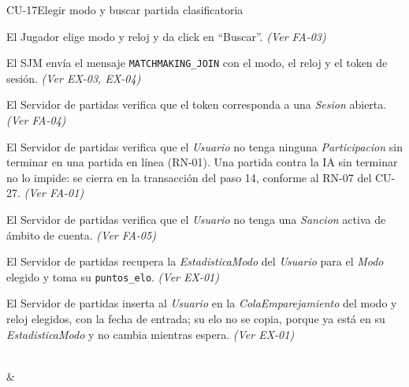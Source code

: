 \begin{fichacu}{CU-17}{Elegir modo y buscar partida clasificatoria}
{\begin{cuenum}[start=1]
      \item El Jugador elige modo y reloj y da click en ``Buscar''. \textit{(Ver \mbox{FA-03})}
      \item El SJM envía el mensaje \texttt{MATCHMAKING\_\allowbreak{}JOIN} con el modo, el reloj y el token de sesión. \textit{(Ver \mbox{EX-03}, \mbox{EX-04})}
      \item El Servidor de partidas verifica que el token corresponda a una \textit{Sesion} abierta. \textit{(Ver \mbox{FA-04})}
      \item El Servidor de partidas verifica que el \textit{Usuario} no tenga ninguna \textit{Participacion} sin terminar en una partida en línea (\mbox{RN-01}). Una partida contra la IA sin terminar no lo impide: se cierra en la transacción del paso 14, conforme al \mbox{RN-07} del \mbox{CU-27}. \textit{(Ver \mbox{FA-01})}
      \item El Servidor de partidas verifica que el \textit{Usuario} no tenga una \textit{Sancion} activa de ámbito de cuenta. \textit{(Ver \mbox{FA-05})}
      \item El Servidor de partidas recupera la \textit{EstadisticaModo} del \textit{Usuario} para el \textit{Modo} elegido y toma su \texttt{puntos\_\allowbreak{}elo}. \textit{(Ver \mbox{EX-01})}
      \item El Servidor de partidas inserta al \textit{Usuario} en la \textit{ColaEmparejamiento} del modo y reloj elegidos, con la fecha de entrada; su elo no se copia, porque ya está en su \textit{EstadisticaModo} y no cambia mientras espera. \textit{(Ver \mbox{EX-01})}
    \end{cuenum}} \\
   & 
\end{fichacu}
